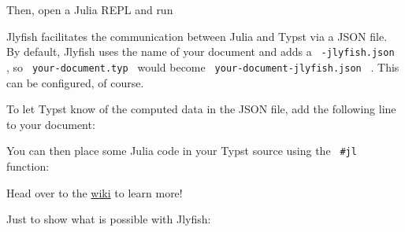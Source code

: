 Then, open a Julia REPL and run

\begin{Shaded}
\begin{Highlighting}[]

\end{Highlighting}
\end{Shaded}

Jlyfish facilitates the communication between Julia and Typst via a JSON
file. By default, Jlyfish uses the name of your document and adds a
\texttt{\ -jlyfish.json\ } , so \texttt{\ your-document.typ\ } would
become \texttt{\ your-document-jlyfish.json\ } . This can be configured,
of course.

To let Typst know of the computed data in the JSON file, add the
following line to your document:

\begin{Shaded}
\begin{Highlighting}[]
\end{Highlighting}
\end{Shaded}

You can then place some Julia code in your Typst source using the
\texttt{\ \#jl\ } function:

\begin{Shaded}
\begin{Highlighting}[]
\end{Highlighting}
\end{Shaded}

Head over to the
\href{https://github.com/andreasKroepelin/TypstJlyfish.jl/wiki}{wiki} to
learn more!

Just to show what is possible with Jlyfish:

\pandocbounded{}

